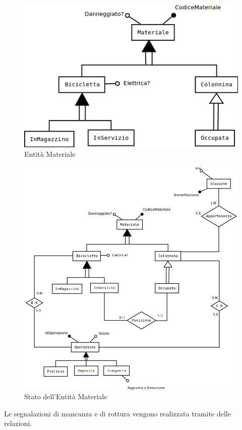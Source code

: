 \documentclass[a4paper,twoside]{article}
\begin{document}
\begin{figure}[H]
 \centering
  \includegraphics[width=1\textwidth]{Immagini-Grafici/Concettuale12.png}
\caption{Entità Materiale}
\end{figure}
\begin{figure}[H]
 \centering
  \includegraphics[width=1\textwidth]{Immagini-Grafici/Concettuale13.png}
\caption{Stato dell'Entità Materiale}
\end{figure}
Le segnalazioni di mancanza e di rottura vengono realizzata tramite delle relazioni.
\end{document}
